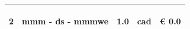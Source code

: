 \documentclass[a4paper]{article}
\begin{document}
\begin{tabular}{ | L{10mm} |  L{86mm} | L{12mm} | L{12mm} | L{16mm} | }
                                   
                                     \vspace{2.5mm}
                                     \begin{spacing}{0}
                                  2
                                     \end{spacing} &
                                     \vspace{2.5mm}
                                     \begin{spacing}{0}
                                  mmm - ds - \newline mmmwe
                                     \end{spacing} &
                                     \vspace{2.5mm}
                                     \begin{spacing}{0}
                                  1.0
                                     \end{spacing} &
                                     \vspace{2.5mm}
                                     \begin{spacing}{0}
                                  cad
                                     \end{spacing} &
                                     \vspace{2.5mm}
                                     \begin{spacing}{0}
                                       \euro\hfill 
                                   0.0
                                     \end{spacing} \\
                                     \hline
    

\end{tabular}
\end{document}
